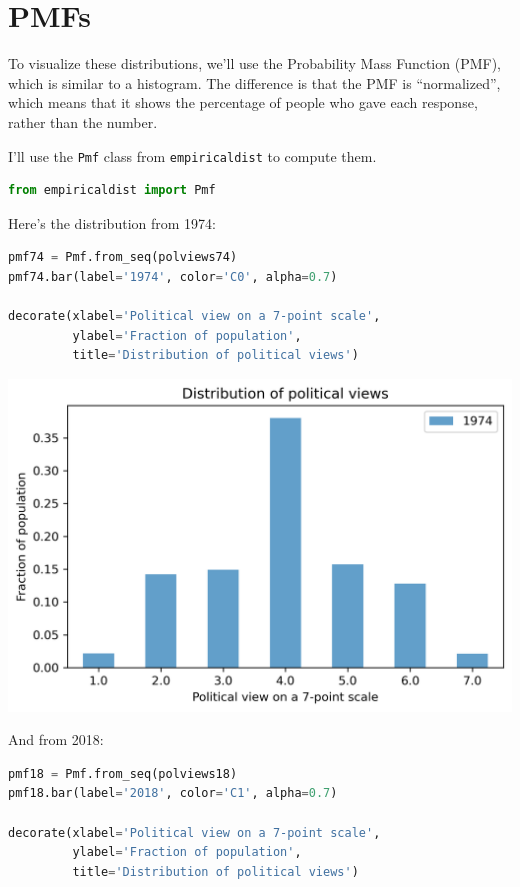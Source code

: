 \hypertarget{pmfs}{%
\section{PMFs}\label{pmfs}}

To visualize these distributions, we'll use the Probability Mass
Function (PMF), which is similar to a histogram. The difference is that
the PMF is ``normalized'', which means that it shows the percentage of
people who gave each response, rather than the number.

I'll use the \passthrough{\lstinline!Pmf!} class from
\passthrough{\lstinline!empiricaldist!} to compute them.

\begin{lstlisting}[language=Python,style=source]
from empiricaldist import Pmf
\end{lstlisting}

Here's the distribution from 1974:

\begin{lstlisting}[language=Python,style=source]
pmf74 = Pmf.from_seq(polviews74)
pmf74.bar(label='1974', color='C0', alpha=0.7)

decorate(xlabel='Political view on a 7-point scale',
         ylabel='Fraction of population',
         title='Distribution of political views')
\end{lstlisting}

\begin{center}
\includegraphics[scale=0.75]{02_polviews_files/02_polviews_30_0.png}
\end{center}

And from 2018:

\begin{lstlisting}[language=Python,style=source]
pmf18 = Pmf.from_seq(polviews18)
pmf18.bar(label='2018', color='C1', alpha=0.7)

decorate(xlabel='Political view on a 7-point scale',
         ylabel='Fraction of population',
         title='Distribution of political views')
\end{lstlisting}

